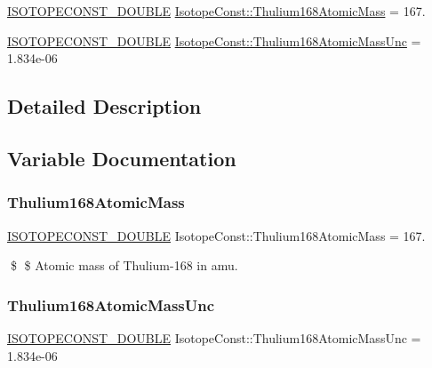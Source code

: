 \begin{DoxyCompactItemize}
\item 
\mbox{\hyperlink{group___isotope_const-_macros_ga8f45a7272ce02c0b4c65c44636ed719a}{I\+S\+O\+T\+O\+P\+E\+C\+O\+N\+S\+T\+\_\+\+D\+O\+U\+B\+LE}} \mbox{\hyperlink{group___isotope_const-_thulium-_tm168_ga38daf47aec018d5ae5495edf5198894d}{Isotope\+Const\+::\+Thulium168\+Atomic\+Mass}} = 167.
\item 
\mbox{\hyperlink{group___isotope_const-_macros_ga8f45a7272ce02c0b4c65c44636ed719a}{I\+S\+O\+T\+O\+P\+E\+C\+O\+N\+S\+T\+\_\+\+D\+O\+U\+B\+LE}} \mbox{\hyperlink{group___isotope_const-_thulium-_tm168_gad3a22c20ee101145d99ad4d6ce18b8bf}{Isotope\+Const\+::\+Thulium168\+Atomic\+Mass\+Unc}} = 1.\+834e-\/06
\end{DoxyCompactItemize}


\subsection{Detailed Description}


\subsection{Variable Documentation}
\mbox{\label{group___isotope_const-_thulium-_tm168_ga38daf47aec018d5ae5495edf5198894d}} 
\subsubsection{\texorpdfstring{Thulium168\+Atomic\+Mass}{Thulium168AtomicMass}}
{\footnotesize\ttfamily \mbox{\hyperlink{group___isotope_const-_macros_ga8f45a7272ce02c0b4c65c44636ed719a}{I\+S\+O\+T\+O\+P\+E\+C\+O\+N\+S\+T\+\_\+\+D\+O\+U\+B\+LE}} Isotope\+Const\+::\+Thulium168\+Atomic\+Mass = 167.}

\$ \$ Atomic mass of Thulium-\/168 in amu. \mbox{\label{group___isotope_const-_thulium-_tm168_gad3a22c20ee101145d99ad4d6ce18b8bf}} 
\subsubsection{\texorpdfstring{Thulium168\+Atomic\+Mass\+Unc}{Thulium168AtomicMassUnc}}
{\footnotesize\ttfamily \mbox{\hyperlink{group___isotope_const-_macros_ga8f45a7272ce02c0b4c65c44636ed719a}{I\+S\+O\+T\+O\+P\+E\+C\+O\+N\+S\+T\+\_\+\+D\+O\+U\+B\+LE}} Isotope\+Const\+::\+Thulium168\+Atomic\+Mass\+Unc = 1.\+834e-\/06}

